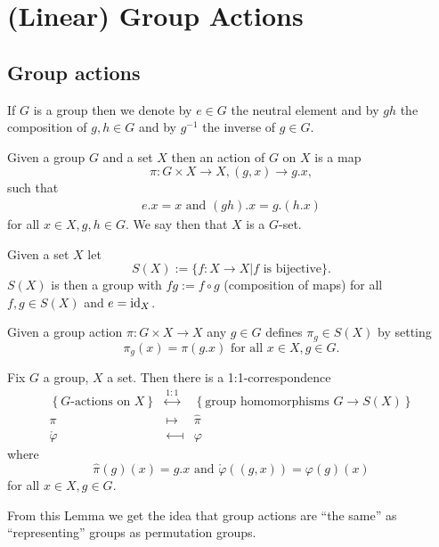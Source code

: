 \chapter{(Linear) Group Actions}


\section{Group actions}


If $G$ is a group then we denote by $e \in G$ the neutral element and by $gh$ the composition of $g,h \in G$ and by $g^{-1}$ the inverse of $g \in G$.


\begin{defi}
 Given a group $G$ and a set $X$ then an action of $G$ on $X$ is a map
 \[
  \pi : G \times X \to X, (g,x) \to g.x,
 \]
 such that
 \begin{gather*}
  e.x = x \text{ and }
  (gh).x = g.(h.x)
 \end{gather*}
 for all $x \in X, g,h \in G$. We say then that $X$ is a $G$-set.
\end{defi}


\begin{defi}
 Given a set $X$ let
 \[
  S(X) := \{f : X \to X | f \text{ is bijective}\}.
 \]
 $S(X)$ is then a group with $fg := f \circ g$ (composition of maps) for all $f,g \in S(X)$ and $e = \operatorname{id}_X$.
\end{defi}


Given a group action $\pi : G \times X \to X$ any  $g \in G$ defines $\pi_g \in S(X)$ by setting
\[
 \pi_g(x) = \pi(g.x) \text{ for all } x \in X, g \in G.
\]


\begin{lem}\label{lem: G-actions = group homos G -> S(X)}
 Fix $G$ a group, $X$ a set. Then there is a 1:1-correspondence
 \[
 \begin{matrix}
    \left\{\text{$G$-actions on $X$}\right\}
  & \overset{1:1}{\longleftrightarrow}
  & \left\{\text{group homomorphisms $G \to S(X)$}\right\} \\
    \pi
  & \longmapsto
  & \hat{\pi} \\
    \mathring{\varphi}
  & \longmapsfrom
  & \varphi
  \end{matrix}
 \]
 where
 \[
  \hat{\pi}(g)(x) = g.x \text{ and } \mathring{\varphi}((g,x)) = \varphi(g)(x)
 \]
 for all $x \in X, g \in G$.
\end{lem}


From this Lemma we get the idea that group actions are ``the same'' as ``representing'' groups as permutation groups.


